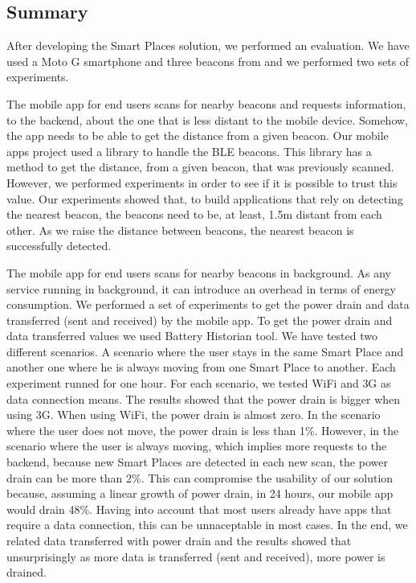 \subsection{Summary}
\label{sec:evaluation_summary}
After developing the Smart Places solution, we performed an evaluation.
We have used a  Moto G smartphone and three beacons from  and we performed two sets of experiments.

The mobile app for end users scans for nearby beacons and requests information, to the backend, about the one that is less distant to the mobile device.
Somehow, the app needs to be able to get the distance from a given beacon.
Our mobile apps project used a library to handle the \gls{BLE} beacons. This library has a method to get the distance, from a given beacon, that was previously scanned.
However, we performed experiments in order to see if it is possible to trust this value.
Our experiments showed that, to build applications that rely on detecting the nearest beacon, the beacons need to be, at least, 1.5m distant from each other.
As we raise the distance between beacons, the nearest beacon is successfully detected.

The mobile app for end users scans for nearby beacons in background.
As any service running in background, it can introduce an overhead in terms of energy consumption.
We performed a set of experiments to get the power drain and data transferred (sent and received) by the mobile app.
To get the power drain and data transferred values we used Battery Historian tool.
We have tested two different scenarios. A scenario where the user stays in the same Smart Place and another one where he is always moving from one Smart Place to another.
Each experiment runned for one hour.
For each scenario, we tested \gls{WiFi} and \gls{3G} as data connection means.
The results showed that the power drain is bigger when using \gls{3G}. When using \gls{WiFi}, the power drain is almost zero.
In the scenario where the user does not move, the power drain is less than 1\%.
However, in the scenario where the user is always moving, which implies more requests to the backend, because new Smart Places are detected in each new scan, the power drain can be more than 2\%.
This can compromise the usability of our solution because, assuming a linear growth of power drain, in 24 hours, our mobile app would drain 48\%.
Having into account that most users already have apps that require a data connection, this can be unnaceptable in most cases.
In the end, we related data transferred with power drain and the results showed that unsurprisingly as more data is transferred (sent and received), more power is drained.
